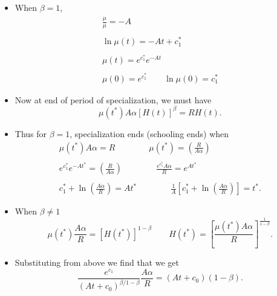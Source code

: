 \documentclass[12pt,compress,handout]{beamer}  %
\begin{document}
\begin{frame}
\begin{itemize}[<+->]
\item
When $\beta =1$,
\begin{gather*}
\frac{\dot{\mu}}{\mu } =-A \\
\\
\ln \mu (t) = -At+c_{1}^{*} \\
\\
\mu (t) = e^{c_{1}^{*}}e^{-At} \\
\\
\mu (0) = e^{c_{1}^{*}}\qquad \ln \mu (0)=c_{1}^{*}
\end{gather*}
\end{itemize}
\end{frame}


\begin{frame}
\begin{itemize}[<+->]
\item
Now at end of period of specialization, we must have
\begin{equation*}
\mu (t^{*})A\alpha [H(t)]^{\beta }=RH(t).
\end{equation*}

\item
Thus for $\beta =1$, specialization ends (schooling ends) when
\begin{gather*}
\mu (t^{*})A\alpha = R \qquad \qquad \mu (t^{*}) = \left( \frac{R}{A\alpha }\right) \\
\\
e^{c_{1}^{*}}e^{-At^{*}} = \left( \frac{R}{A\alpha }\right) \qquad \qquad \frac{e^{c_{1}^{*}}A\alpha }{R} = e^{At^{*}} \\
\\
c_{1}^{*}+\ln \left( \frac{A\alpha }{R}\right) = At^{*} \qquad
\qquad \frac{1}{A}\left[ c_{1}^{*}+\ln \left( \frac{A\alpha
}{R}\right) \right] = t^{*}.
\end{gather*}
\end{itemize}
\end{frame}


\begin{frame}
\begin{itemize}[<+->]
\item
When $\beta \neq 1$
\begin{equation*}
\mu (t^{*})\frac{A\alpha }{R} = [H(t^{*})]^{1-\beta } \qquad
H(t^{*}) = \left[ \frac{\mu (t^{*})A\alpha }{R}\right]
^{\frac{1}{1-\beta }}.
\end{equation*}

\item
Substituting from above we find that we get
\begin{equation*}
\frac{e^{c_{1}}}{(At+c_{0})^{\beta /1-\beta }}\frac{A\alpha
}{R}=(At+c_{0})(1-\beta ).
\end{equation*}
\end{itemize}
\end{frame}
\end{document}

